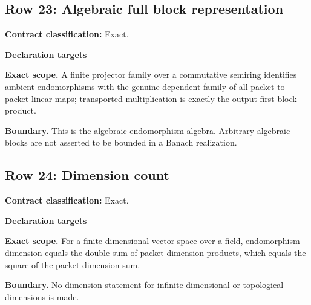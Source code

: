 \subsection{Row 23: Algebraic full block representation}
\label{row:23}
\textbf{Contract classification:} Exact.
\par\smallskip\textbf{Declaration targets}\par
{\small\noindent{}\par}
{\small\noindent{}\par}
{\small\noindent{}\par}
{\small\noindent{}\par}
\medskip\noindent\textbf{Exact scope.} A finite projector family over a commutative semiring identifies ambient endomorphisms with the genuine dependent family of all packet-to-packet linear maps; transported multiplication is exactly the output-first block product.
\par\smallskip\noindent\textbf{Boundary.} This is the algebraic endomorphism algebra. Arbitrary algebraic blocks are not asserted to be bounded in a Banach realization.
\medskip
\subsection{Row 24: Dimension count}
\label{row:24}
\textbf{Contract classification:} Exact.
\par\smallskip\textbf{Declaration targets}\par
{\small\noindent{}\par}
{\small\noindent{}\par}
\medskip\noindent\textbf{Exact scope.} For a finite-dimensional vector space over a field, endomorphism dimension equals the double sum of packet-dimension products, which equals the square of the packet-dimension sum.
\par\smallskip\noindent\textbf{Boundary.} No dimension statement for infinite-dimensional or topological dimensions is made.
\medskip
